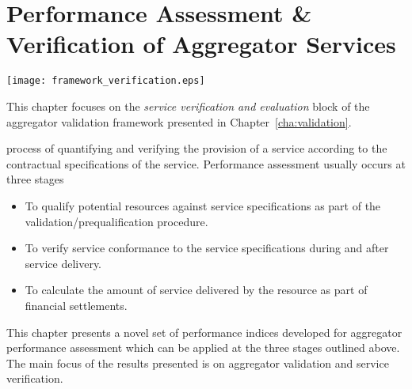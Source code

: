 \chapter{Performance Assessment \& Verification of Aggregator Services} %
\label{cha:verification}
\begin{marginfigure}
	\texttt{[image: framework\_verification.eps]}
	\caption{This chapter focuses on the \emph{service verification and evaluation} block of the aggregator validation framework presented in Chapter~\ref{cha:validation}.}
      \label{fig:frameworkverification}
\end{marginfigure}
 process of quantifying and verifying the provision of a service according to the contractual specifications of the service. Performance assessment usually occurs at three stages
\begin{itemize}
	\item To qualify potential resources against service specifications as part of the validation/prequalification procedure.
	\item To verify service conformance to the service specifications during and after service delivery. 
	\item To calculate the amount of service delivered by the resource as part of financial settlements.
\end{itemize}

This chapter presents a novel set of performance indices developed for aggregator performance assessment which can be applied at the three stages outlined above. The main focus of the results presented is on aggregator validation and service verification. 

